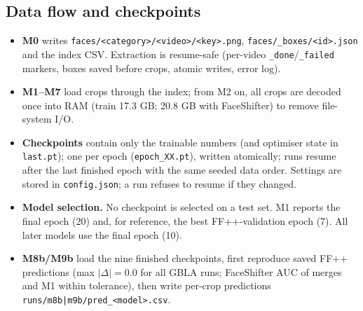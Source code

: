 \documentclass[10pt,a4paper]{article}
\begin{document}
\subsection{Data flow and checkpoints}
\begin{itemize}
\item \textbf{M0} writes \texttt{faces/<category>/<video>/<key>.png}, \texttt{faces/\_boxes/<id>.json} and
the index CSV. Extraction is resume-safe (per-video \texttt{\_done}/\texttt{\_failed} markers, boxes
saved before crops, atomic writes, error log).
\item \textbf{M1--M7} load crops through the index; from M2 on, all crops are decoded once into RAM
(train 17.3 GB; 20.8 GB with FaceShifter) to remove file-system I/O.
\item \textbf{Checkpoints} contain only the trainable numbers (and optimiser state in
\texttt{last.pt}); one per epoch (\texttt{epoch\_XX.pt}), written atomically; runs resume after the last
finished epoch with the same seeded data order. Settings are stored in \texttt{config.json}; a run
refuses to resume if they changed.
\item \textbf{Model selection.} No checkpoint is selected on a test set. M1 reports the final epoch
(20) and, for reference, the best FF++-validation epoch (7). All later models use the final epoch (10).
\item \textbf{M8b/M9b} load the nine finished checkpoints, first reproduce saved FF++ predictions
(max \(|\Delta|=0.0\) for all GBLA runs; FaceShifter AUC of merges and M1 within tolerance), then
write per-crop predictions \texttt{runs/m8b|m9b/pred\_<model>.csv}.
\end{itemize}
\end{document}
